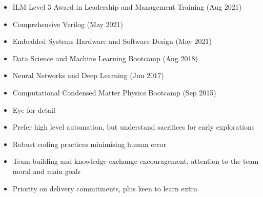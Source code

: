 \documentclass[10pt,a4paper,ragged2e,withhyper]{altacv}
\begin{document}
\begin{paracol}{2}
\begin{itemize}
    \item ILM Level 3 Award in Leadership and Management Training (Aug 2021)
    
    \item Comprehensive Verilog (May 2021)
    
    \item Embedded Systems Hardware and Software Design (May 2021)
    
    \item Data Science and Machine Learning Bootcamp (Aug 2018)
    
    \item Neural Networks and Deep Learning (Jun 2017)
    
    \item Computational Condensed Matter Physics Bootcamp (Sep 2015)
\end{itemize}



\begin{itemize}
    \item Eye for detail
    
    \item Prefer high level automation, but understand sacrifices for
    early explorations
    
    \item Robust coding practices minimising human error
    
    \item Team building and knowledge exchange encouragement,
    attention to the team moral and main goals
    
    \item Priority on delivery commitments, plus keen to learn extra
\end{itemize}



\end{paracol}
\end{document}
